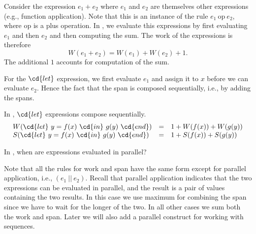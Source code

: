 \begin{definition}
\end{definition}

\begin{example}
Consider the expression $e_1 + e_2$ where $e_1$ and $e_2$ are
themselves other expressions (e.g., function application).  Note that
this is an instance of the rule $e_1~\mbox{op}~e_2$, where \mbox{op} is a plus operation.
%
In \PML{}, we evaluate this expressions by first evaluating $e_1$ and
then $e_2$ and then computing the sum.  The work of the expressions is
therefore
\[
W(e_1 + e_2) = W(e_1) + W(e_2) + 1
.
\]
The additional $1$ accounts for computation of the sum.   
\end{example}

\begin{flex}
\begin{gram}
For the $\cd{let}$ expression, we first evaluate $e_1$ and assign it
to $x$ before we can evaluate $e_2$.  Hence the fact that the span is
composed sequentially, i.e., by adding the spans.
\end{gram}

\begin{example}
In \pml, $\cd{let}$ expressions compose sequentially.
\[
\begin{array}{lcl}
W(\cd{let}~y = f(x)~\cd{in}~g(y)~\cd{end}) & = & 1 + W(f(x)) + W(g(y))
\\
S(\cd{let}~y = f(x)~\cd{in}~g(y)~\cd{end}) & = & 1 + S(f(x)) + S(g(y))
\end{array}
\]
\end{example}
\end{flex}

\begin{teachask}
In \PML{}, when are expressions evaluated in parallel?
\end{teachask}

\begin{gram}
Note that all the rules for work and span 
have the same form except for parallel application, i.e., $(e_1\ ||\ e_2)$.    
%
Recall that parallel application indicates that the two 
expressions can be evaluated in parallel, and the result is a pair of values 
containing the two results. 
%
In this case we use maximum for combining the span since we have
to wait for the longer of the two.   In all other
cases we sum both the work and span.
%
Later we will also add a parallel construct for working with
sequences.
\end{gram}

